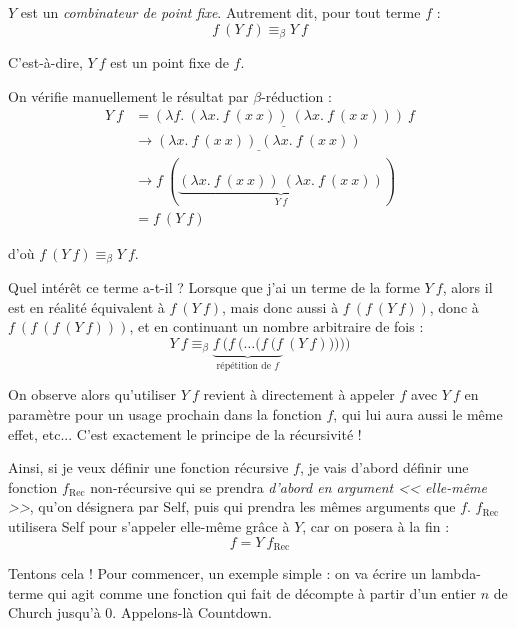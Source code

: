 \documentclass[11pt]{article}
\begin{document}
\begin{theorem}
    $Y$ est un \textit{combinateur de point fixe}. Autrement dit, pour tout terme $f$ :
    $$f~\left(Y~f\right) \equiv_\beta Y~f$$

    C'est-à-dire, $Y~f$ est un point fixe de $f$.

    \begin{preuve}
    On vérifie manuellement le résultat par $\beta$-réduction :
    \begin{equation*}
    \begin{aligned}
        Y~f&=\underline{\left(\lambda f.~\left(\lambda x.~f~(x~x)\right)~\left(\lambda x.~f~(x~x)\right)\right)~f}\\
        &\longrightarrow \underline{\left(\lambda x.~f~(x~x)\right)~\left(\lambda x.~f~(x~x)\right)}\\
        &\longrightarrow f~(\underbrace{\left(\lambda x.~f~(x~x)\right)~\left(\lambda x.~f~(x~x)\right)}_{Y~f})\\
        &=f~\left(Y~f\right)
    \end{aligned}
    \end{equation*}

    d'où $f~\left(Y~f\right) \equiv_\beta Y~f$.
    \end{preuve}
\end{theorem}

Quel intérêt ce terme a-t-il ? Lorsque que j'ai un terme de la forme $Y~f$, alors il est en réalité équivalent à $f~(Y~f)$, mais donc aussi à $f~(f~(Y~f))$, donc à $f~(f~(f~(Y~f)))$, et en continuant un nombre arbitraire de fois :
$$Y~f \equiv_\beta \underbrace{f~(f~(\dots (f~(f}_\text{répétition de $f$}~(Y~f)))))$$

On observe alors qu'utiliser $Y~f$ revient à directement à appeler $f$ avec $Y~f$ en paramètre pour un usage prochain dans la fonction $f$, qui lui aura aussi le même effet, etc... C'est exactement le principe de la récursivité !

Ainsi, si je veux définir une fonction récursive $f$, je vais d'abord définir une fonction $f_\text{Rec}$ non-récursive qui se prendra \textit{d'abord en argument << elle-même >>}, qu'on désignera par $\text{Self}$, puis qui prendra les mêmes arguments que $f$. $f_\text{Rec}$ utilisera Self pour s'appeler elle-même grâce à $Y$, car on posera à la fin :
$$f=Y~f_\text{Rec}$$

Tentons cela ! Pour commencer, un exemple simple : on va écrire un lambda-terme qui agit comme une fonction qui fait de décompte à partir d'un entier $n$ de Church jusqu'à 0. Appelons-là Countdown.
\end{document}
